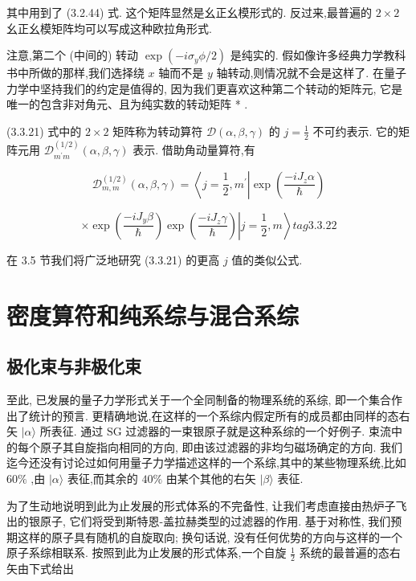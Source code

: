 其中用到了 (3.2.44) 式. 这个矩阵显然是幺正幺模形式的. 反过来,最普遍的 $2 \times 2$ 幺正幺模矩阵均可以写成这种欧拉角形式.

注意,第二个 (中间的) 转动 $\exp \left( {-i{\sigma }_{y}\phi /2}\right)$ 是纯实的. 假如像许多经典力学教科书中所做的那样,我们选择绕 $x$ 轴而不是 $y$ 轴转动,则情况就不会是这样了. 在量子力学中坚持我们的约定是值得的, 因为我们更喜欢这种第二个转动的矩阵元, 它是唯一的包含非对角元、且为纯实数的转动矩阵 * .

(3.3.21) 式中的 $2 \times 2$ 矩阵称为转动算符 $\mathcal{D}\left( {\alpha ,\beta ,\gamma }\right)$ 的 $j = \frac{1}{2}$ 不可约表示. 它的矩阵元用 ${\mathcal{D}}_{{m}^{\prime }m}^{\left( 1/2\right) }\left( {\alpha ,\beta ,\gamma }\right)$ 表示. 借助角动量算符,有

$$
{\mathcal{D}}_{m, m}^{\left( 1/2\right) }\left( {\alpha ,\beta ,\gamma }\right) = \left\langle {j = \frac{1}{2},{m}^{\prime }}\right| \exp \left( \frac{-i{J}_{z}\alpha }{\hslash }\right)
$$

$$
\times \exp \left( \frac{-i{J}_{y}\beta }{\hslash }\right) \exp \left( \frac{-i{J}_{z}\gamma }{\hslash }\right) \left| {j = \frac{1}{2}, m}\right\rangle tag{3. 3.22}
$$

在 3.5 节我们将广泛地研究 (3.3.21) 的更高 $j$ 值的类似公式.

\section{密度算符和纯系综与混合系综}
\subsection{极化束与非极化束}

至此, 已发展的量子力学形式关于一个全同制备的物理系统的系综, 即一个集合作出了统计的预言. 更精确地说,在这样的一个系综内假定所有的成员都由同样的态右矢 $|\alpha \rangle$ 所表征. 通过 $\mathrm{{SG}}$ 过滤器的一束银原子就是这种系综的一个好例子. 束流中的每个原子其自旋指向相同的方向, 即由该过滤器的非均匀磁场确定的方向. 我们迄今还没有讨论过如何用量子力学描述这样的一个系综,其中的某些物理系统,比如 ${60}\%$ ,由 $|\alpha \rangle$ 表征,而其余的 ${40}\%$ 由某个其他的右矢 $|\beta \rangle$ 表征.

为了生动地说明到此为止发展的形式体系的不完备性, 让我们考虑直接由热炉子飞出的银原子, 它们将受到斯特恩-盖拉赫类型的过滤器的作用. 基于对称性, 我们预期这样的原子具有随机的自旋取向; 换句话说, 没有任何优势的方向与这样的一个原子系综相联系. 按照到此为止发展的形式体系,一个自旋 $\frac{1}{2}$ 系统的最普遍的态右矢由下式给出

